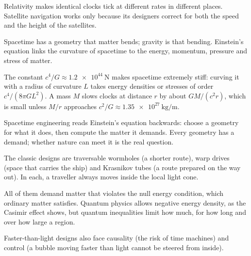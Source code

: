 \begin{chaptersummary}
\item Relativity makes identical clocks tick at different rates in different
  places. Satellite navigation works only because its designers correct for
  both the speed and the height of the satellites.
\item Spacetime has a geometry that matter bends; gravity is that bending.
  Einstein's equation links the curvature of spacetime to the energy,
  momentum, pressure and stress of matter.
\item The constant $c^{4}/G \approx \SI{1.2e44}{\newton}$ makes spacetime
  extremely stiff: curving it with a radius of curvature $L$ takes energy
  densities or stresses of order $c^{4}/(8\pi G L^{2})$. A mass $M$ slows
  clocks at distance $r$ by about
  $GM/(c^{2}r)$, which is small unless $M/r$ approaches
  $c^{2}/G \approx \SI{1.35e27}{\kilogram\per\metre}$.
\item Spacetime engineering reads Einstein's equation backwards: choose a
  geometry for what it does, then compute the matter it demands. Every
  geometry has a demand; whether nature can meet it is the real question.
\item The classic designs are traversable wormholes (a shorter route), warp
  drives (space that carries the ship) and Krasnikov tubes (a route prepared
  on the way out). In each, a traveller always moves inside the local light
  cone.
\item All of them demand matter that violates the null energy condition,
  which ordinary matter satisfies. Quantum physics allows negative energy
  density, as the Casimir effect shows, but quantum inequalities limit how
  much, for how long and over how large a region.
\item Faster-than-light designs also face causality (the risk of time
  machines) and control (a bubble moving faster than light cannot be steered
  from inside).
\end{chaptersummary}

